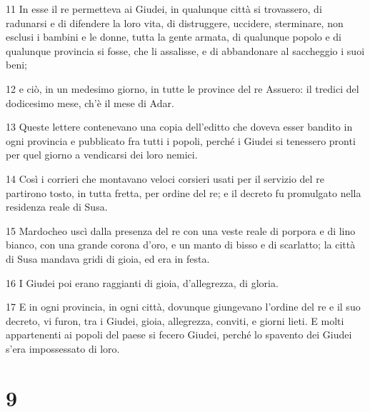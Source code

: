 \par 11 In esse il re permetteva ai Giudei, in qualunque città si trovassero, di radunarsi e di difendere la loro vita, di distruggere, uccidere, sterminare, non esclusi i bambini e le donne, tutta la gente armata, di qualunque popolo e di qualunque provincia si fosse, che li assalisse, e di abbandonare al saccheggio i suoi beni;
\par 12 e ciò, in un medesimo giorno, in tutte le province del re Assuero: il tredici del dodicesimo mese, ch'è il mese di Adar.
\par 13 Queste lettere contenevano una copia dell'editto che doveva esser bandito in ogni provincia e pubblicato fra tutti i popoli, perché i Giudei si tenessero pronti per quel giorno a vendicarsi dei loro nemici.
\par 14 Così i corrieri che montavano veloci corsieri usati per il servizio del re partirono tosto, in tutta fretta, per ordine del re; e il decreto fu promulgato nella residenza reale di Susa.
\par 15 Mardocheo uscì dalla presenza del re con una veste reale di porpora e di lino bianco, con una grande corona d'oro, e un manto di bisso e di scarlatto; la città di Susa mandava gridi di gioia, ed era in festa.
\par 16 I Giudei poi erano raggianti di gioia, d'allegrezza, di gloria.
\par 17 E in ogni provincia, in ogni città, dovunque giungevano l'ordine del re e il suo decreto, vi furon, tra i Giudei, gioia, allegrezza, conviti, e giorni lieti. E molti appartenenti ai popoli del paese si fecero Giudei, perché lo spavento dei Giudei s'era impossessato di loro.

\chapter{9}

